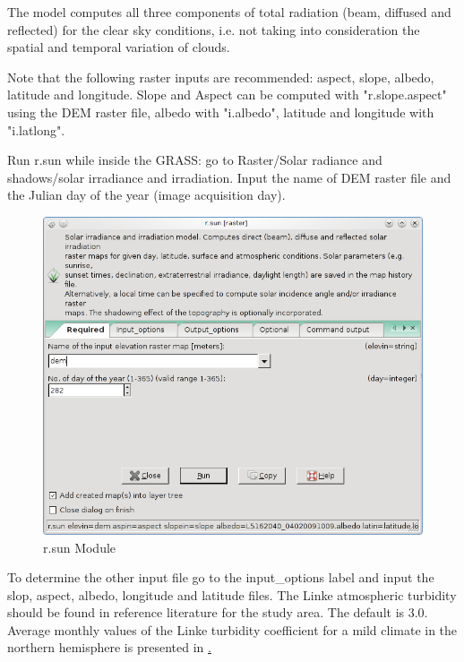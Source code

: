 The model computes all three components of total radiation (beam, diffused and reflected) for the clear sky conditions, i.e. not taking into consideration the spatial and temporal variation of clouds. \newline

Note that the following raster inputs are recommended: aspect, slope, albedo, latitude and longitude. Slope and Aspect can be computed with "r.slope.aspect" using the DEM raster file, albedo with "i.albedo", latitude and longitude with "i.latlong".\newline

Run r.sun while inside the GRASS: go to Raster/Solar radiance and shadows/solar irradiance and irradiation. Input the name of DEM raster file and the Julian day of the year (image acquisition day). \newline

\begin{figure}[htbp]
   \centering
   \includegraphics[scale=0.4]{gipe022.png}
   \caption{r.sun Module}
   \label{fig:gipe022}
\end{figure}

To determine the other input file go to the input\_options label and input the slop, aspect, albedo, longitude and latitude files. The Linke atmospheric turbidity should be found in reference literature for the study area. The default is 3.0. Average monthly values of the Linke turbidity coefficient for a mild climate in the northern hemisphere is presented in \href{tab:001}.\newline

